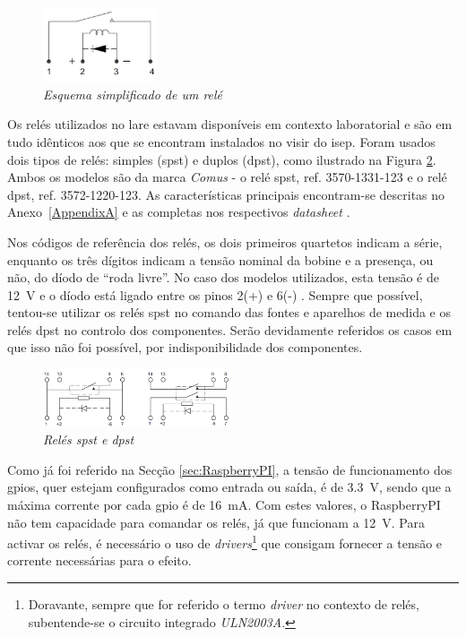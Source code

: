 \begin{figure}[hbtp]
    \centering
    \includegraphics[width=0.3\textwidth]{figures/esquematico_rele.png}
    \caption{\textit{Esquema simplificado de um relé \cite{DryRelay}}}
    \label{fig:esquematicoreles}
\end{figure}

Os relés utilizados no \acrshort{lare} estavam disponíveis em contexto laboratorial e são em tudo idênticos aos que se encontram instalados no \acrshort{visir}  do \acrshort{isep}. Foram usados dois tipos de relés: simples (\acrfull{spst}) e duplos (\acrfull{dpst}), como ilustrado na Figura \ref {fig:reles}. Ambos os modelos são da marca \textit{Comus} - o relé \acrshort{spst}, ref. 3570-1331-123 e o relé \acrshort{dpst}, ref. 3572-1220-123. As características principais encontram-se descritas no Anexo~\ref{AppendixA} e as completas nos respectivos \textit{datasheet} \cite{DryRelay}. 

Nos códigos de referência dos relés, os dois primeiros quartetos indicam a série, enquanto os três dígitos indicam a tensão nominal da bobine e a presença, ou não, do díodo de ``roda livre''. No caso dos modelos utilizados, esta tensão é de \SI{12}{\volt} e o díodo está ligado entre os pinos 2(+) e 6(-) \cite{DryRelay}. Sempre que possível, tentou-se utilizar os relés \acrshort{spst} no comando das fontes e aparelhos de medida e os relés \acrshort{dpst} no controlo dos componentes. Serão devidamente referidos os casos em que isso não foi possível, por indisponibilidade dos componentes.

\begin{figure}[hbtp]
    \centering
    \includegraphics[width=0.5\textwidth]{figures/reles.png}
    \caption{\textit{Relés \acrshort{spst} e \acrshort{dpst}} \cite{DryRelay}}
    \label{fig:reles}
\end{figure}

Como já foi referido na Secção \ref{sec:RaspberryPI}, a tensão de funcionamento dos \acrshort{gpio}s, quer estejam configurados como entrada ou saída, é de \SI{3.3}{\volt}, sendo que a máxima corrente por cada \acrshort{gpio} é de \SI{16}{\mA}.
Com estes valores, o \gls{RaspberryPI} não tem capacidade para comandar os relés, já que funcionam a \SI{12}{\volt}. Para activar os relés, é necessário o uso de \textit{drivers}\footnote{Doravante, sempre que for referido o termo \textit{driver} no contexto de relés, subentende-se o circuito integrado \textit{ULN2003A}.} que consigam fornecer a tensão e corrente necessárias para o efeito.

